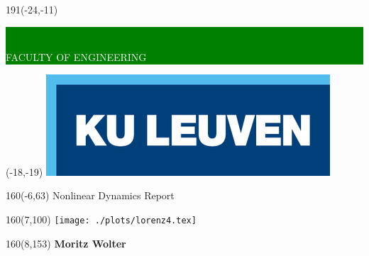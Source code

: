 

\thispagestyle{empty}
\newcommand{\form}[1]{\scalebox{1.087}{\boldmath{#1}}}
\sffamily
%
\begin{textblock}{191}(-24,-11)
\colorbox{green}{\hspace{139mm}\ \parbox[c][18truemm]{60mm}{\textcolor{white}{FACULTY OF ENGINEERING}}}
\end{textblock}
%
\begin{textblock}{70}(-18,-19)
\textblockcolour{}
\includegraphics*[height=19.8truemm]{./src/LogoKULeuven}
\end{textblock}
%
\begin{textblock}{160}(-6,63)
\textblockcolour{}
\vspace{-\parskip}
\flushleft
\fontsize{40}{42}\selectfont \textcolor{bluetitle}{Nonlinear Dynamics Report }\\[1.5mm]
\end{textblock}
%
\begin{textblock}{160}(7,100)
\texttt{[image: ./plots/lorenz4.tex]}
\end{textblock}
%
\begin{textblock}{160}(8,153)
\textblockcolour{}
\vspace{-\parskip}
\flushright
\fontsize{14}{16}\selectfont \textbf{Moritz Wolter}
\end{textblock}
%
